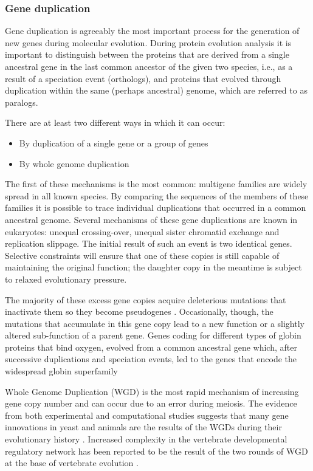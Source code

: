 \documentclass[11pt, a4paper,oneside]{report}
\begin{document}
\subsubsection{Gene duplication}
Gene duplication is agreeably the most important process for the generation of new genes during molecular evolution. During protein evolution analysis it is important to distinguish between the proteins that are derived from a single ancestral gene in the last common ancestor of the given two species, i.e., as a result of a speciation event (orthologs), and proteins that evolved through duplication within the same (perhaps ancestral) genome, which are referred to as paralogs\cite{Jensen2001}.

There are at least two different ways in which it can occur: 
\begin{itemize} 
\item By duplication of a single gene or a group of genes 
\item By whole genome duplication 
\end{itemize}

The first of these mechanisms is the most common: multigene families are widely spread in all known species. By comparing the sequences of the members of these families it is possible to trace individual duplications that occurred in a common ancestral genome. Several mechanisms of these gene duplications are known in eukaryotes: unequal crossing-over, unequal sister chromatid exchange and replication slippage. The initial result of such an event is two identical genes. Selective constraints will ensure that one of these copies is still capable of maintaining the original function; the daughter copy in the meantime is subject to relaxed evolutionary pressure.

The majority of these excess gene copies acquire deleterious mutations that inactivate them so they become pseudogenes \cite{Zhang2001}. Occasionally, though, the mutations that accumulate in this gene copy lead to a new function or a slightly altered sub-function of a parent gene.  Genes coding for different types of globin proteins that bind oxygen, evolved from a common ancestral gene which, after successive duplications and speciation events, led to the genes that encode the widespread globin superfamily \cite{Hardison1998}

Whole Genome Duplication (WGD) is the most rapid mechanism of increasing gene copy number and can occur due to an error during meiosis. The evidence from both experimental and computational studies suggests that many gene innovations in yeast and animals are the results of the WGDs during their evolutionary history \cite{Dehal2005}. Increased complexity in the vertebrate developmental regulatory network has been reported to be the result of the two rounds of WGD at the base of vertebrate evolution \cite{Huminiecki2012}. 
\end{document}
